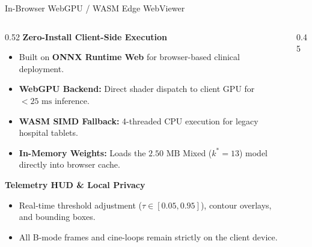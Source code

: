 \documentclass[aspectratio=169, 10pt]{beamer}
\begin{document}
\begin{frame}{In-Browser WebGPU / WASM Edge WebViewer}
\begin{columns}[T, onlytextwidth]
  \begin{column}{0.52\textwidth}
    \textbf{Zero-Install Client-Side Execution}
    \begin{itemize}\setlength{\itemsep}{3pt}\footnotesize
      \item Built on \textbf{ONNX Runtime Web} for browser-based clinical deployment.
      \item \textbf{WebGPU Backend:} Direct shader dispatch to client GPU for $<25\text{ ms}$ inference.
      \item \textbf{WASM SIMD Fallback:} 4-threaded CPU execution for legacy hospital tablets.
      \item \textbf{In-Memory Weights:} Loads the $2.50\text{ MB}$ Mixed ($k^*=13$) model directly into browser cache.
    \end{itemize}

    \vspace{0.6em}

    \textbf{Telemetry HUD \& Local Privacy}
    \begin{itemize}\setlength{\itemsep}{3pt}\footnotesize
      \item Real-time threshold adjustment ($\tau \in [0.05, 0.95]$), contour overlays, and bounding boxes.
      \item All B-mode frames and cine-loops remain strictly on the client device.
    \end{itemize}
  \end{column}

  \begin{column}{0.45\textwidth}
    \begin{center}
      \vspace{0.2em}
\end{center}
\end{column}
\end{columns}
\end{frame}
\end{document}
